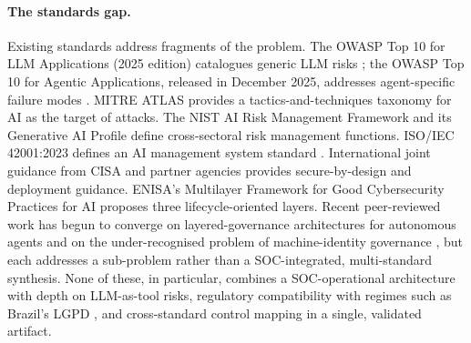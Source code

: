 \documentclass[preprint,12pt,authoryear]{elsarticle}
\begin{document}
\paragraph{The standards gap.} Existing standards address fragments of the problem. The OWASP Top 10 for LLM Applications (2025 edition) catalogues generic LLM risks \citep{owasp2025llm}; the OWASP Top 10 for Agentic Applications, released in December 2025, addresses agent-specific failure modes \citep{owasp2025agentic,owasp2025agenticthreats}. MITRE ATLAS \citep{mitre2025atlas} provides a tactics-and-techniques taxonomy for AI as the target of attacks. The NIST AI Risk Management Framework \citep{nist2023airmf} and its Generative AI Profile \citep{nist2024genai} define cross-sectoral risk management functions. ISO/IEC 42001:2023 defines an AI management system standard \citep{iso42001}. International joint guidance from CISA and partner agencies \citep{cisa2023ncsc,nsa2024deploying,cisa_roadmap} provides secure-by-design and deployment guidance. ENISA's Multilayer Framework for Good Cybersecurity Practices for AI \citep{enisa2023multilayer} proposes three lifecycle-oriented layers. Recent peer-reviewed work has begun to converge on layered-governance architectures for autonomous agents \citep{lga2026,lang2026,4c2026} and on the under-recognised problem of machine-identity governance \citep{airt_migt2026}, but each addresses a sub-problem rather than a SOC-integrated, multi-standard synthesis. None of these, in particular, combines a SOC-operational architecture with depth on LLM-as-tool risks, regulatory compatibility with regimes such as Brazil's LGPD \citep{lgpd2018}, and cross-standard control mapping in a single, validated artifact.

\end{document}
